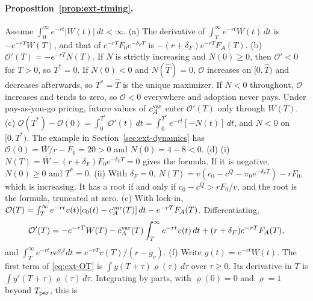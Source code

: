 \paragraph{Proposition~\ref{prop:ext-timing}.} Assume $\int_0^\infty e^{-rt}|W(t)|\,dt<\infty$.
(a) The derivative of $\int_T^\infty e^{-rt}W(t)\,dt$ is $-e^{-rT}W(T)$, and that of $e^{-rT}F_0e^{-\delta_FT}$ is $-(r+\delta_F)e^{-rT}F_A(T)$.
(b) $\mathcal O'(T)=-e^{-rT}N(T)$. If $N$ is strictly increasing and $N(0)\ge0$, then $\mathcal O'<0$ for $T>0$, so $T^*=0$. If $N(0)<0$ and $N(\hat T)=0$, $\mathcal O$ increases on $[0,\hat T)$ and decreases afterwards, so $T^*=\hat T$ is the unique maximizer. If $N<0$ throughout, $\mathcal O$ increases and tends to zero, so $\mathcal O<0$ everywhere and adoption never pays. Under pay-as-you-go pricing, future values of $c^{\rm var}_A$ enter $\mathcal O'(T)$ only through $W(T)$.
(c) $\mathcal O(T^*)-\mathcal O(0)=\int_0^{T^*}\mathcal O'(t)\,dt=\int_0^{T^*}e^{-rt}[-N(t)]\,dt$, and $N<0$ on $[0,T^*)$. The example in Section~\ref{sec:ext-dynamics} has $\mathcal O(0)=\bar W/r-F_0=20>0$ and $N(0)=4-8<0$.
(d) (i) $N(T)=\bar W-(r+\delta_F)F_0e^{-\delta_FT}=0$ gives the formula. If it is negative, $N(0)\ge0$ and $T^*=0$. (ii) With $\delta_F=0$, $N(T)=v(c_0-c^Q-\pi_0e^{-\delta_\pi T})-rF_0$, which is increasing. It has a root if and only if $c_0-c^Q>rF_0/v$, and the root is the formula, truncated at zero.
(e) With lock-in, $\mathcal O(T)=\int_T^\infty e^{-rt}v(t)[c_0(t)-c^{\rm var}_A(T)]\,dt-e^{-rT}F_A(T)$. Differentiating,
\[
\mathcal O'(T)=-e^{-rT}W(T)-\dot c^{\rm var}_A(T)\int_T^\infty e^{-rt}v(t)\,dt+(r+\delta_F)e^{-rT}F_A(T),
\]
and $\int_T^\infty e^{-rt}ve^{g_vt}dt=e^{-rT}v(T)/(r-g_v)$.
(f) Write $y(t)=e^{-rt}W(t)$. The first term of \eqref{eq:ext-OT} is $\int y(T+\tau)\varrho(\tau)\,d\tau$ over $\tau\ge0$. Its derivative in $T$ is $\int y'(T+\tau)\varrho(\tau)\,d\tau$. Integrating by parts, with $\varrho(0)=0$ and $\varrho=1$ beyond $T_{\rm par}$, this is
